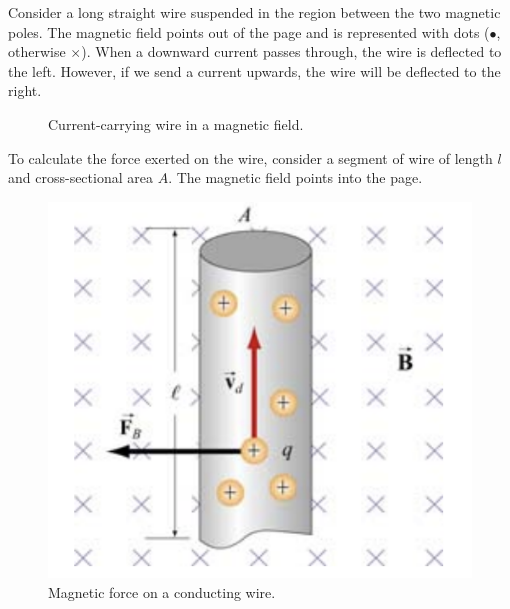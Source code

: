 \documentclass[11pt, letterpaper]{article}
\theoremstyle{definition}
\theoremstyle{remark}
\begin{document}
Consider a long straight wire suspended in the region between the two magnetic poles. The magnetic field points out of the page and is represented with dots ($\bullet$, otherwise $\times$). When a downward current passes through, the wire is deflected to the left. However, if we send a current upwards, the wire will be deflected to the right.
\begin{figure}[h!]
		\centering
		\qquad
		\qquad
		\caption{Current-carrying wire in a magnetic field.}
\end{figure}

To calculate the force exerted on the wire, consider a segment of wire of length $l$ and cross-sectional area $A$. The magnetic field points into the page. 
\begin{figure}[h!]
	\centering
	\includegraphics[scale=0.6]{wire}
	\caption{Magnetic force on a conducting wire.}
	\label{fig:wire}
\end{figure}
\end{document}
